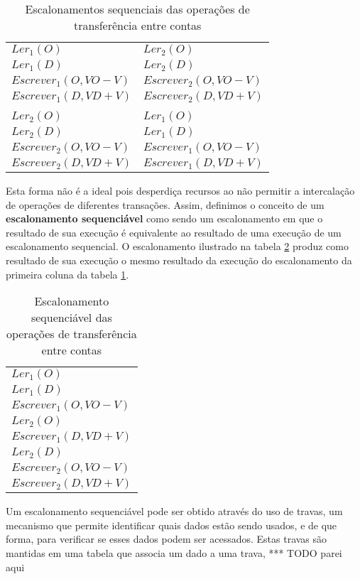 \documentclass[11pt,twoside,a4paper]{book}
\begin{document}
\begin{table}
\caption{Escalonamentos sequenciais das operações de transferência entre contas}
\label{tab:escalonamento_sequencial}
\centering
\begin{tabular}{ | l | l | }
	\hline
	$Ler_1(O)$&$Ler_2(O)$\\
	$Ler_1(D)$&$Ler_2(D)$\\
	$Escrever_1(O, VO - V)$&$Escrever_2(O, VO - V)$\\
	$Escrever_1(D, VD + V)$&$Escrever_2(D, VD + V)$\\
	&\\
	$Ler_2(O)$&$Ler_1(O)$\\
	$Ler_2(D)$&$Ler_1(D)$\\
	$Escrever_2(O, VO - V)$&$Escrever_1(O, VO - V)$\\
	$Escrever_2(D, VD + V)$&$Escrever_1(D, VD + V)$\\
	\hline
\end{tabular}
\end{table}

Esta forma não é a ideal pois desperdiça recursos ao não permitir a intercalação de operações de diferentes transações. Assim, definimos o conceito de um \textbf{escalonamento sequenciável} como sendo um escalonamento em que o resultado de sua execução é equivalente ao resultado de uma execução de um escalonamento sequencial. O escalonamento ilustrado na tabela \ref{tab:escalonamento_sequenciavel} produz como resultado de sua execução o mesmo resultado da execução do escalonamento da primeira coluna da tabela \ref{tab:escalonamento_sequencial}.

\begin{table}
\caption{Escalonamento sequenciável das operações de transferência entre contas}
\label{tab:escalonamento_sequenciavel}
\centering
\begin{tabular}{ | l | }
	\hline
	$Ler_1(O)$\\
	$Ler_1(D)$\\
	$Escrever_1(O, VO - V)$\\
	$Ler_2(O)$\\
	$Escrever_1(D, VD + V)$\\
	$Ler_2(D)$\\
	$Escrever_2(O, VO - V)$\\
	$Escrever_2(D, VD + V)$\\
	\hline
\end{tabular}
\end{table}

Um escalonamento sequenciável pode ser obtido através do uso de travas, um mecanismo que permite identificar quais dados estão sendo usados, e de que forma, para verificar se esses dados podem ser acessados. Estas travas são mantidas em uma tabela que associa um dado a uma trava, *** TODO parei aqui
\end{document}
